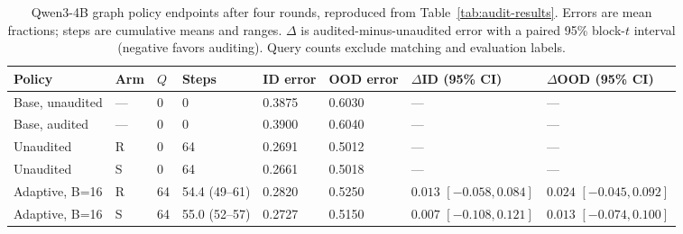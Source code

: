 \begin{table}[H]
\caption{Qwen3-4B graph policy endpoints after four rounds, reproduced from Table~\ref{tab:audit-results}. Errors are mean fractions; steps are cumulative means and ranges. $\Delta$ is audited-minus-unaudited error with a paired 95\% block-$t$ interval (negative favors auditing). Query counts exclude matching and evaluation labels.}
\label{tab:qwen4b-policy-endpoints}
\centering\small\setlength{\tabcolsep}{3pt}
\begin{tabular}{@{}llllllll@{}}
\toprule
Policy & Arm & $Q$ & Steps & ID error & OOD error & \shortstack{$\Delta$ID\\(95\% CI)} & \shortstack{$\Delta$OOD\\(95\% CI)}\\
\midrule
Base, unaudited & --- & 0 & 0 & 0.3875 & 0.6030 & --- & ---\\
Base, audited & --- & 0 & 0 & 0.3900 & 0.6040 & --- & ---\\
Unaudited & R & 0 & 64 & 0.2691 & 0.5012 & --- & ---\\
Unaudited & S & 0 & 64 & 0.2661 & 0.5018 & --- & ---\\
Adaptive, B=16 & R & 64 & 54.4 (49--61) & 0.2820 & 0.5250 & \shortstack{$0.013$\\$[-0.058,0.084]$} & \shortstack{$0.024$\\$[-0.045,0.092]$}\\
Adaptive, B=16 & S & 64 & 55.0 (52--57) & 0.2727 & 0.5150 & \shortstack{$0.007$\\$[-0.108,0.121]$} & \shortstack{$0.013$\\$[-0.074,0.100]$}\\
\bottomrule
\end{tabular}
\end{table}
